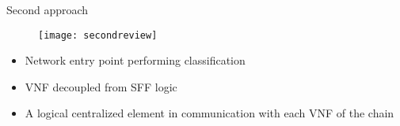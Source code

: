 \begin{frame}{Second approach}

  \vspace{-0.5cm}

  \begin{figure}
    \centering
    \texttt{[image: secondreview]}
  \end{figure}

  \vspace{0.2cm}

  \begin{itemize}
    \item Network entry point performing classification
    \item VNF decoupled from SFF logic
    \item A logical centralized element in communication with each VNF of the
    chain
  \end{itemize}

\end{frame}
